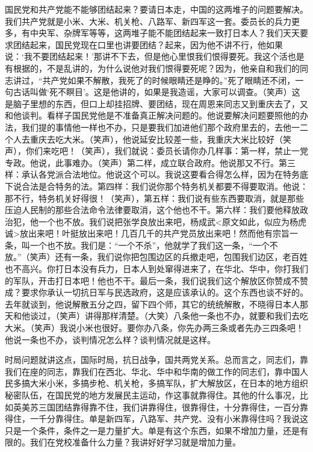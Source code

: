 国民党和共产党能不能够团结起来？要请日本走，中国的这两堆子的问题要解决。我们共产党就是小米、大米、机关枪、八路军、新四军这一套。委员长的兵力更多，有中央军、杂牌军等等，这两堆子能不能团结起来一致打日本人？我们天天要求团结起来，国民党现在口里也讲要团结？起来，因为他不讲不行，他如果说：‘我不要团结起来！’那讲不下去，但是他心里恨我们恨得要死。我这个活也是有根据的，不是乱讲的，为什么说他对我们恨得要死呢？因为，他亲自和我们的同志讲过，“共产党如果不解散，我死了的时候眼睛还是睁的。”死了眼睛还不闭，一句古话叫做‘死不瞑目’。这是他讲的，如果是我造谣，大家可以调查。（笑声）这是脑子里想的东西，但口上却挂招牌、要团结，现在周恩来同志又到重庆去了，又和他谈判。看样子国民党他是不准备真正解决问题的。他说要解决问题要照他的办法，我们提的事情他一样也不办，只是要我们加进他们那个政府里去的，去他一二个人去重庆去吃大米。（笑声），他说延安比较差一些，我重庆大米比较好（笑声），你们来吃吧！（笑声），我们就说：委员长请你办几样事：第一样，禁止一党专政。他说，此事难办。（笑声）第二样，成立联合政府。他说那又不行。第三样：承认各党派合法地位。他说这个可以。我说这要看合得怎么样，因为在特务底下说合法是合特务的法。第四样：我们说你那个特务机关都要不得要取消。他说：那不行，特务机关好得很！（笑声），第五样：我们说有些东西要取消，就是那些压迫人民制的那些合法命令法律要取消，这个他也不干。第六样：我们要他释放政治犯，他一个也不放。我们说把张学良放出来吧，杨成武<原文如此，似应为杨虎诚>放出来吧！叶挺放出来吧！几百几千的共产党员放出来吧！然而他有宗旨一条，叫一个也不放。我们是：“一个不杀”，他就学了我们这一条，“一个不放。”（笑声）还有一条，我们说你把包围边区的兵撤走吧，包围我们边区，老百姓也不高兴。你打日本没有兵力，日本人到处窜得进来了，在华北、华中，你打我们的军队，开击打日本吧！他也不干。最后一条，我们说我们这个解放区你赞成不赞成？要求你承认一切抗日军与民选政府，这是应该承认的。这个东西也谈不好的。去年就谈到，他说解散五分之四，留下四个师，其它的统统解散，不晓得日本人那天和他谈过，（笑声）讲得那样清楚。（大笑）八条他一条也不办，就要和我们去吃大米。（笑声）我说小米也很好。要你办八条，你先办两三条或者先办三四条吧！他说一条也不办，谈判情况怎么样？谈判情况就是这样。

时局问题就讲这点，国际时局，抗日战争，国共两党关系。总而言之，同志们，靠我们在座的同志，靠我们在西北、华北、华中和华南的做工作的同志们，靠中国人民多搞大米小米，多搞步枪、机关枪，多搞军队，扩大解放区，在日本的地方组织秘密队伍，在国民党的地方发展民主运动，作这事就靠得住。其他的什么事况，比如英美苏三国团结靠得靠不住，我们讲靠得住，很靠得住，十分靠得住，一百分靠得住，一千分靠得住。单是新四军，八路军、共产党、没有小米靠得住吗？我说这只是一个条件，条件之一是力量扩大。单是有这个东西，如果不增加力量，还是有限的。我们在党校准备什么力量？我讲好好学习就是增加力量。

